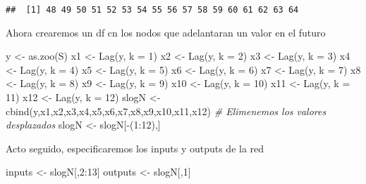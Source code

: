 \documentclass[
]{book}
\newenvironment{Shaded}{\begin{snugshade}}{\end{snugshade}}
\newcommand{\AttributeTok}[1]{\textcolor[rgb]{0.77,0.63,0.00}{#1}}
\newcommand{\CommentTok}[1]{\textcolor[rgb]{0.56,0.35,0.01}{\textit{#1}}}
\newcommand{\DecValTok}[1]{\textcolor[rgb]{0.00,0.00,0.81}{#1}}
\newcommand{\FunctionTok}[1]{\textcolor[rgb]{0.00,0.00,0.00}{#1}}
\newcommand{\NormalTok}[1]{#1}
\newcommand{\OtherTok}[1]{\textcolor[rgb]{0.56,0.35,0.01}{#1}}
\newcommand{\SpecialCharTok}[1]{\textcolor[rgb]{0.00,0.00,0.00}{#1}}
\begin{document}
\begin{verbatim}
##  [1] 48 49 50 51 52 53 54 55 56 57 58 59 60 61 62 63 64
\end{verbatim}

Ahora crearemos un df cn los nodos que adelantaran un valor en el futuro

\begin{Shaded}
\begin{Highlighting}[]
\NormalTok{y }\OtherTok{\textless{}{-}} \FunctionTok{as.zoo}\NormalTok{(S)}
\NormalTok{x1 }\OtherTok{\textless{}{-}} \FunctionTok{Lag}\NormalTok{(y, }\AttributeTok{k =} \DecValTok{1}\NormalTok{)}
\NormalTok{x2 }\OtherTok{\textless{}{-}} \FunctionTok{Lag}\NormalTok{(y, }\AttributeTok{k =} \DecValTok{2}\NormalTok{)}
\NormalTok{x3 }\OtherTok{\textless{}{-}} \FunctionTok{Lag}\NormalTok{(y, }\AttributeTok{k =} \DecValTok{3}\NormalTok{)}
\NormalTok{x4 }\OtherTok{\textless{}{-}} \FunctionTok{Lag}\NormalTok{(y, }\AttributeTok{k =} \DecValTok{4}\NormalTok{)}
\NormalTok{x5 }\OtherTok{\textless{}{-}} \FunctionTok{Lag}\NormalTok{(y, }\AttributeTok{k =} \DecValTok{5}\NormalTok{)}
\NormalTok{x6 }\OtherTok{\textless{}{-}} \FunctionTok{Lag}\NormalTok{(y, }\AttributeTok{k =} \DecValTok{6}\NormalTok{)}
\NormalTok{x7 }\OtherTok{\textless{}{-}} \FunctionTok{Lag}\NormalTok{(y, }\AttributeTok{k =} \DecValTok{7}\NormalTok{)}
\NormalTok{x8 }\OtherTok{\textless{}{-}} \FunctionTok{Lag}\NormalTok{(y, }\AttributeTok{k =} \DecValTok{8}\NormalTok{)}
\NormalTok{x9 }\OtherTok{\textless{}{-}} \FunctionTok{Lag}\NormalTok{(y, }\AttributeTok{k =} \DecValTok{9}\NormalTok{)}
\NormalTok{x10 }\OtherTok{\textless{}{-}} \FunctionTok{Lag}\NormalTok{(y, }\AttributeTok{k =} \DecValTok{10}\NormalTok{)}
\NormalTok{x11 }\OtherTok{\textless{}{-}} \FunctionTok{Lag}\NormalTok{(y, }\AttributeTok{k =} \DecValTok{11}\NormalTok{)}
\NormalTok{x12 }\OtherTok{\textless{}{-}} \FunctionTok{Lag}\NormalTok{(y, }\AttributeTok{k =} \DecValTok{12}\NormalTok{)}
\NormalTok{slogN }\OtherTok{\textless{}{-}} \FunctionTok{cbind}\NormalTok{(y,x1,x2,x3,x4,x5,x6,x7,x8,x9,x10,x11,x12)}
\CommentTok{\# Elimenemos los valores desplazados}
\NormalTok{slogN }\OtherTok{\textless{}{-}}\NormalTok{ slogN[}\SpecialCharTok{{-}}\NormalTok{(}\DecValTok{1}\SpecialCharTok{:}\DecValTok{12}\NormalTok{),]}
\end{Highlighting}
\end{Shaded}

Acto seguido, especificaremos los inputs y outputs de la red

\begin{Shaded}
\begin{Highlighting}[]
\NormalTok{inputs }\OtherTok{\textless{}{-}}\NormalTok{ slogN[,}\DecValTok{2}\SpecialCharTok{:}\DecValTok{13}\NormalTok{]}
\NormalTok{outputs }\OtherTok{\textless{}{-}}\NormalTok{ slogN[,}\DecValTok{1}\NormalTok{]}
\end{Highlighting}
\end{Shaded}
\end{document}
